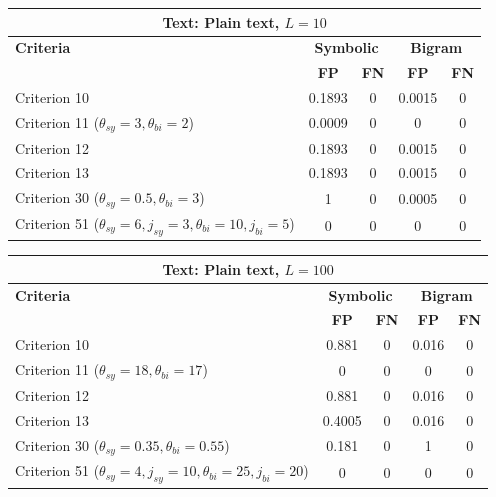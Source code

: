\begin{center}
\renewcommand{\arraystretch}{1.2}
\setlength{\tabcolsep}{6pt}
\begin{tabular}{|l||c|c||c|c|}
\hline
\multicolumn{5}{|c|}{\textbf{Text: Plain text, $L=10$}} \\
\hline
\textbf{Criteria} & \multicolumn{2}{c||}{\textbf{Symbolic}} & \multicolumn{2}{c|}{\textbf{Bigram}} \\
\hline
 & \textbf{FP} & \textbf{FN} & \textbf{FP} & \textbf{FN} \\
\hline
Criterion 10 & 0.1893 & 0 & 0.0015 & 0 \\
Criterion 11 ($\theta_{sy}=3, \theta_{bi}=2$) & 0.0009 & 0 & 0 & 0 \\
Criterion 12 & 0.1893 & 0 & 0.0015 & 0 \\
Criterion 13 & 0.1893 & 0 & 0.0015 & 0 \\
Criterion 30 ($\theta_{sy}=0.5, \theta_{bi}=3$) & 1 & 0 & 0.0005 & 0 \\
Criterion 51 ($\theta_{sy}=6, j_{sy}=3, \theta_{bi}=10, j_{bi}=5$) & 0 & 0 & 0 & 0 \\
\hline
\end{tabular}
\end{center}

\begin{center}
\renewcommand{\arraystretch}{1.2}
\setlength{\tabcolsep}{6pt}
\begin{tabular}{|l||c|c||c|c|}
\hline
\multicolumn{5}{|c|}{\textbf{Text: Plain text, $L=100$}} \\
\hline
\textbf{Criteria} & \multicolumn{2}{c||}{\textbf{Symbolic}} & \multicolumn{2}{c|}{\textbf{Bigram}} \\
\hline
 & \textbf{FP} & \textbf{FN} & \textbf{FP} & \textbf{FN} \\
\hline
Criterion 10 & 0.881 & 0 & 0.016 & 0 \\
Criterion 11 ($\theta_{sy}=18, \theta_{bi}=17$) & 0 & 0 & 0 & 0 \\
Criterion 12 & 0.881 & 0 & 0.016 & 0 \\
Criterion 13 & 0.4005 & 0 & 0.016 & 0 \\
Criterion 30 ($\theta_{sy}=0.35, \theta_{bi}=0.55$) & 0.181 & 0 & 1 & 0 \\
Criterion 51 ($\theta_{sy}=4, j_{sy}=10, \theta_{bi}=25, j_{bi}=20$) & 0 & 0 & 0 & 0 \\
\hline
\end{tabular}
\end{center}

